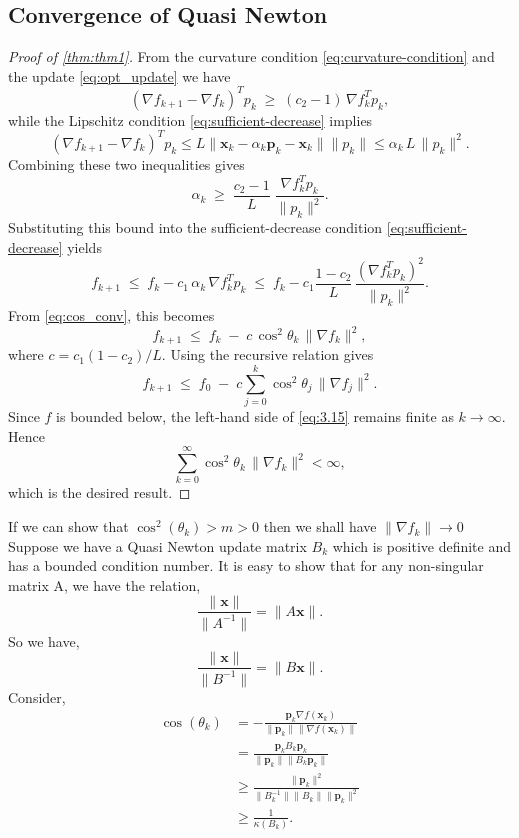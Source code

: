 \documentclass[12pt]{report}
\begin{document}
\subsection{Convergence of Quasi Newton}
\begin{proof}[Proof of \autoref{thm:thm1}]
	From the curvature condition \eqref{eq:curvature-condition} and the update \eqref{eq:opt_update} we have
	\[
		(\nabla f_{k+1}-\nabla f_k)^T p_k \;\ge\;(c_2-1)\,\nabla f_k^T p_k,
	\]
	while the Lipschitz condition \eqref{eq:sufficient-decrease} implies
	\[
		(\nabla f_{k+1}-\nabla f_k)^T p_k \le L \|\bm x_{k}-\alpha_k \bm p_k -\bm x_{k}\| \|p_k\| \le\alpha_k\,L\,\|p_k\|^2.
	\]
	Combining these two inequalities gives
	\[
		\alpha_k \;\ge\;\frac{c_2-1}{L}\;\frac{\nabla f_k^T p_k}{\|p_k\|^2}.
	\]
	Substituting this bound into the sufficient-decrease condition \eqref{eq:sufficient-decrease} yields
	\[
		f_{k+1}
		\;\le\;
		f_k - c_1\,\alpha_k\,\nabla f_k^T p_k
		\;\le\;
		f_k - c_1\frac{1-c_2}{L}\,\frac{(\nabla f_k^T p_k)^2}{\|p_k\|^2}.
	\]
	From \eqref{eq:cos_conv}, this becomes
	\[
		f_{k+1} \;\le\; f_k \;-\; c\,\cos^2\theta_k\,\|\nabla f_k\|^2,
	\]
	where $c = c_1(1-c_2)/L$.  Using the recursive relation gives
	\begin{equation}\label{eq:3.15}
		f_{k+1} \;\le\; f_0 \;-\; c\sum_{j=0}^k \cos^2\theta_j\,\|\nabla f_j\|^2.
	\end{equation}
	Since $f$ is bounded below, the left‐hand side of \eqref{eq:3.15} remains finite as $k\to\infty$.  Hence
	\[
		\sum_{k=0}^\infty \cos^2\theta_k\,\|\nabla f_k\|^2 < \infty,
	\]
	which is the desired result.
\end{proof}
If we can show that $\cos^2(\theta_k) > m>0$ then we shall have $\|\nabla f_k\| \to 0$
Suppose we have a Quasi Newton update matrix $B_k$ which is positive definite and has a bounded condition number.
It is easy to show that for any non-singular matrix A, we have the relation,
\[
	\frac{\|\bm x\|}{\|A^{-1}\|} = \|A\bm x\|
	.\]
So we have,
\[
	\frac{\|\bm x\|}{\|B^{-1}\|} = \|B\bm x\|
	.\]
Consider,
\begin{align*}
	\cos(\theta_k) & =   -\frac{\bm p_k \nabla f(\bm x_k)}{\|\bm p_k\|\|\nabla f(\bm x_k) \|} \\
	               & =   \frac{\bm p_k B_k \bm p_k }{\|\bm p_k\|\|B_k \bm p_k \|} \\
	               & \ge \frac{\|\bm p_k\|^2}{\|B_k^{-1}\| \|B_k\| \|\bm p_k\|^2} \\
	               & \ge \frac{1}{\kappa(B_k)}
	.\end{align*}
\end{document}
